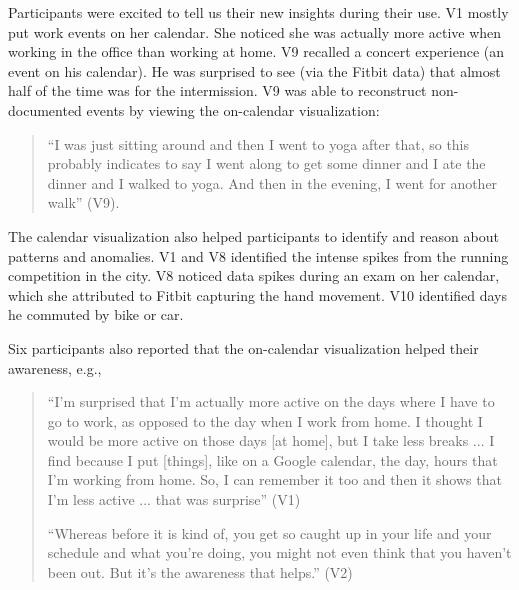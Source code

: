 \documentclass[12pt,oneside]{book}
\begin{document}
Participants were excited to tell us their new insights during their use. V1 mostly put work events on her calendar. She noticed she was actually more active when working in the office than working at home. V9 recalled a concert experience (an event on his calendar). He was surprised to see (via the Fitbit data) that almost half of the time was for the intermission. V9 was able to reconstruct non-documented events by viewing the on-calendar visualization: 
\begin{quote}
``I was just sitting around and then I went to yoga after that, so this probably indicates to say I went along to get some dinner and I ate the dinner and I walked to yoga. And then in the evening, I went for another walk'' (V9). 
\end{quote}

The calendar visualization also helped participants to identify and reason about patterns and anomalies. V1 and V8 identified the intense spikes from the running competition in the city. V8 noticed data spikes during an exam on her calendar, which she attributed to Fitbit capturing the hand movement. V10 identified days he commuted by bike or car. 

Six participants also reported that the on-calendar visualization helped their awareness, e.g., 
\begin{quote}
``I{\rq}m surprised that I{\rq}m actually more active on the days where I have to go to work, as opposed to the day when I work from home. I thought I would be more active on those days [at home], but I take less breaks ... I find because I put [things], like on a Google calendar, the day, hours that I{\rq}m working from home.  So, I can remember it too and then it shows that I{\rq}m less active ... that was surprise''  (V1)

``Whereas before it is kind of, you get so caught up in your life and your schedule and what you're doing, you might not even think that you haven{\rq}t been out. But it's the awareness that helps.'' (V2)
\end{quote}
\end{document}

